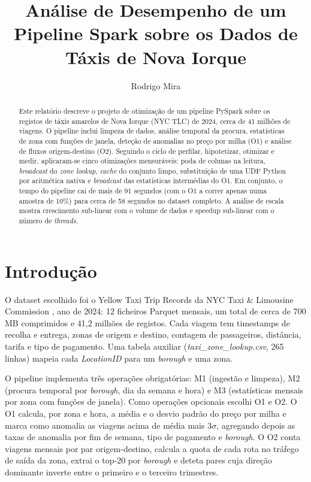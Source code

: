 \documentclass[sigconf]{acmart}
\begin{document}
\title{Análise de Desempenho de um Pipeline Spark sobre os Dados de Táxis de Nova Iorque}

\author{Rodrigo Mira}

\begin{abstract}
Este relatório descreve o projeto de otimização de um pipeline PySpark
sobre os registos de táxis amarelos de Nova Iorque (NYC TLC) de 2024,
cerca de 41 milhões de viagens. O pipeline inclui limpeza de dados,
análise temporal da procura, estatísticas de zona com funções de janela,
deteção de anomalias no preço por milha (O1) e análise de fluxos
origem-destino (O2). Seguindo o ciclo de perfilar, hipotetizar, otimizar
e medir, aplicaram-se cinco otimizações
mensuráveis: poda de colunas na leitura, \emph{broadcast} do \emph{zone
lookup}, \emph{cache} do conjunto limpo, substituição de uma UDF Python
por aritmética nativa e \emph{broadcast} das estatísticas intermédias do
O1. Em conjunto, o tempo do pipeline cai de mais de 91 segundos (com o
O1 a correr apenas numa amostra de 10\%) para cerca de 58 segundos no
dataset completo. A análise de escala mostra crescimento sub-linear com o
volume de dados e speedup sub-linear com o número de \emph{threads}.
\end{abstract}

\maketitle

\section{Introdução}

O dataset escolhido foi o Yellow Taxi Trip Records da NYC Taxi \&
Limousine Commission \cite{nyctlc}, ano de 2024: 12 ficheiros Parquet
mensais, um total de cerca de 700 MB comprimidos e 41,2 milhões de
registos. Cada viagem tem timestamps de recolha e entrega, zonas de
origem e destino, contagem de passageiros, distância, tarifa e tipo de
pagamento. Uma tabela auxiliar (\emph{taxi\_zone\_lookup.csv}, 265
linhas) mapeia cada \emph{LocationID} para um \emph{borough} e uma zona.

O pipeline implementa três operações obrigatórias: M1 (ingestão e
limpeza), M2 (procura temporal por \emph{borough}, dia da semana e hora)
e M3 (estatísticas mensais por zona com funções de janela). Como
operações opcionais escolhi O1 e O2. O O1 calcula, por zona e hora, a
média e o desvio padrão do preço por milha e marca como anomalia as
viagens acima de média mais $3\sigma$, agregando depois as taxas de
anomalia por fim de semana, tipo de pagamento e \emph{borough}. O O2
conta viagens mensais por par origem-destino, calcula a quota de cada
rota no tráfego de saída da zona, extrai o top-20 por \emph{borough} e
deteta pares cuja direção dominante inverte entre o primeiro e o terceiro
trimestres.
\end{document}
